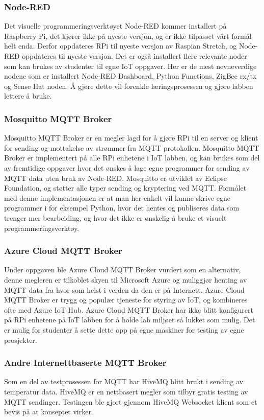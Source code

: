\documentclass{article}
\begin{document}
\subsubsection{Node-RED}
Det visuelle programmeringsverktøyet Node-RED kommer installert på Raspberry Pi, det kjører ikke på nyeste versjon, og er ikke tilpasset vårt formål helt enda. Derfor oppdateres RPi til nyeste versjon av Raspian Stretch, og Node-RED oppdateres til nyeste versjon. Det er også installert flere relevante noder som kan brukes av studenter til egne IoT oppgaver. Her er de mest nevneverdige nodene som er installert Node-RED Dashboard, Python Functions, ZigBee rx/tx og Sense Hat noden. Å gjøre dette vil forenkle læringsprosessen og gjøre labben lettere å bruke.


\subsubsection{Mosquitto MQTT Broker}
Mosquitto MQTT Broker er en megler lagd for å gjøre RPi til en server og klient for sending og mottakelse av strømmer fra MQTT protokollen. Mosquitto MQTT Broker er implementert på alle RPi enhetene i IoT labben, og kan brukes som del av fremtidige oppgaver hvor det ønskes å lage egne programmer for sending av MQTT data uten bruk av Node-RED. Mosquitto er utviklet av Eclipse Foundation, og støtter alle typer sending og kryptering ved MQTT. Formålet med denne implementasjonen er at man her enkelt vil kunne skrive egne programmer i for eksempel Python, hvor det hentes og publiseres data som trenger mer bearbeiding, og hvor det ikke er ønskelig å bruke et visuelt programmeringsverktøy.

\subsubsection{Azure Cloud MQTT Broker}
Under oppgaven ble Azure Cloud MQTT Broker vurdert som en alternativ, denne megleren er tilkoblet skyen til Microsoft Azure og muliggjør henting av MQTT data fra hvor som helst i verden da den er på Internett. Azure Cloud MQTT Broker er trygg og populær tjeneste for styring av IoT, og kombineres ofte med Azure IoT Hub. Azure Cloud MQTT Broker har ikke blitt konfigurert på RPi enhetene på IoT labben for å holde lab miljøet så lukket som mulig. Det er mulig for studenter å sette dette opp på egne maskiner for testing av egne prosjekter.

\subsubsection{Andre Internettbaserte MQTT Broker}
Som en del av testprosessen for MQTT har HiveMQ blitt brukt i sending av temperatur data. HiveMQ er en nettbasert megler som tilbyr gratis testing av MQTT sendinger. Testingen ble gjort gjennom HiveMQ Websocket klient som et bevis på at konseptet virker.
\end{document}
